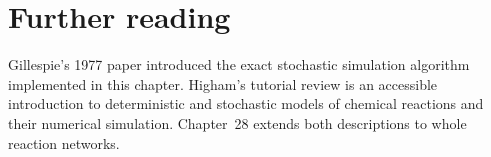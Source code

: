 \section*{Further reading}
Gillespie's 1977 paper introduced the exact stochastic simulation algorithm
implemented in this chapter.\cite{Gillespie1977} Higham's tutorial review is an
accessible introduction to deterministic and stochastic models of chemical
reactions and their numerical simulation.\cite{Higham2008} Chapter~28 extends
both descriptions to whole reaction networks.
